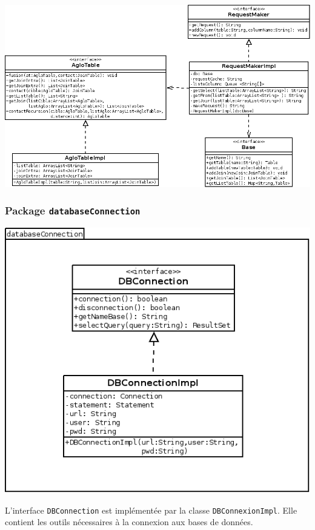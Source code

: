 \documentclass[12pt]{report}
\begin{document}
\bigskip

\includegraphics[scale=0.5]{bduml/cookingRequeste.png}



\subsubsection*{Package \texttt{databaseConnection}}

\begin{center}
\includegraphics[scale=0.5]{bduml/databaseConnection.png}
\end{center}


L'interface \texttt{DBConnection} est implémentée par la classe \texttt{DBConnexionImpl}. Elle contient les outils nécessaires à la connexion aux bases de données.
\end{document}
